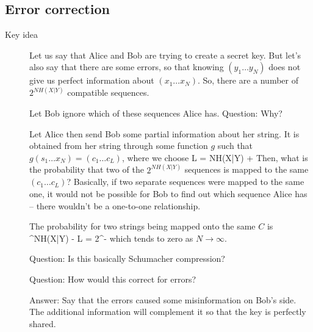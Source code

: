 \subsection{Error correction}
\begin{description}
\item[Key idea] Let us say that Alice and Bob are trying to create a secret key. But let's also say that there are some errors, so that knowing $(y_1 \ldots y_N)$ does not give us perfect information about $(x_1 \ldots x_N)$. So, there are a number of $2^{NH(X|Y)}$ compatible sequences. 

Let Bob ignore which of these sequences Alice has. Question: Why? 

Let Alice then send Bob some partial information about her string. It is obtained from her string through some function $g$ such that $g(s_1 \ldots x_N) = (c_1 \ldots c_L)$, where we choose
\beq
L = NH(X|Y) + 
\eeq
Then, what is the probability that two of the $2^{NH(X|Y)}$ sequences is mapped to the same $(c_1 \ldots c_L)$? Basically, if two separate sequences were mapped to the same one, it would not be possible for Bob to find out which sequence Alice has -- there wouldn't be a one-to-one relationship. 

The probability for two strings being mapped onto the same $C$ is 
^{NH(X|Y) - L} = 2^{- }
\eeq
which tends to zero as $N \rightarrow \infty$. 

Question: Is this basically Schumacher compression? 

Question: How would this correct for errors? 

Answer: Say that the errors caused some misinformation on Bob's side. The additional information will complement it so that the key is perfectly shared. 

\end{description}
